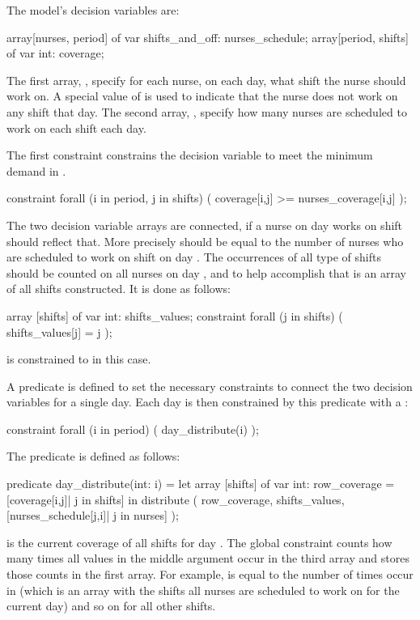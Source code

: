 \documentclass[a4paper,12pt]{article}
\begin{document}
The model's decision variables are:
\begin{mznnobreak}[label=lst:vars,caption={\null}]
array[nurses, period] of var shifts_and_off: nurses_schedule;
array[period, shifts] of var int: coverage;
\end{mznnobreak}
The first array, , specify for each nurse, on each day, what shift the
nurse should work on. A special value of  is used to indicate that the
nurse does not work on any shift that day. The second array, , specify how
many nurses are scheduled to work on each shift each day.

The first constraint constrains the decision variable  to meet the minimum
demand in .
\begin{mznnobreak}[caption={\null}]
constraint forall (i in period, j in shifts) (
   coverage[i,j] >= nurses_coverage[i,j]
);
\end{mznnobreak}

The two decision variable arrays are connected, if a nurse  on day  works on
shift  should  reflect that. More precisely
should  be equal to the number of nurses who are scheduled to work on
shift  on day . The occurrences of all type of shifts should be counted on all nurses on
day , and to help accomplish that is an array of all shifts 
constructed. It is done as follows:
\begin{mznnobreak}[label=lst:shifts,caption={\null}]
array [shifts] of var int: shifts_values;
constraint forall (j in shifts) (
  shifts_values[j] = j
);
\end{mznnobreak}
 is constrained to \mi{[1,2,3]} in this case.

A predicate  is defined to set the necessary constraints to connect the
two decision variables for a single day. Each day is then constrained by this predicate
with a :
\begin{mznnobreak}[caption={\null}]
constraint forall (i in period) (
  day_distribute(i)
);
\end{mznnobreak}
The predicate is defined as follows:
\begin{mznnobreak}[label=lst:distribute,caption={\null}]
predicate day_distribute(int: i) = let {
  array [shifts] of var int: row_coverage =
    [coverage[i,j]| j in shifts]
  }
  in distribute (
    row_coverage,
    shifts_values,
    [nurses_schedule[j,i]| j in nurses]
    );
\end{mznnobreak}
\begin{sloppypar}
   is the current coverage of all shifts for day . The global
  constraint  counts how many times all values in the middle argument occur
  in the third array and stores those counts in the first array. For example,
   is equal to the number of times  occur in
  \mbox{} (which is an array with the
  shifts all nurses are scheduled to work on for the current day) and so on for all other
  shifts.
\end{sloppypar}
\end{document}
